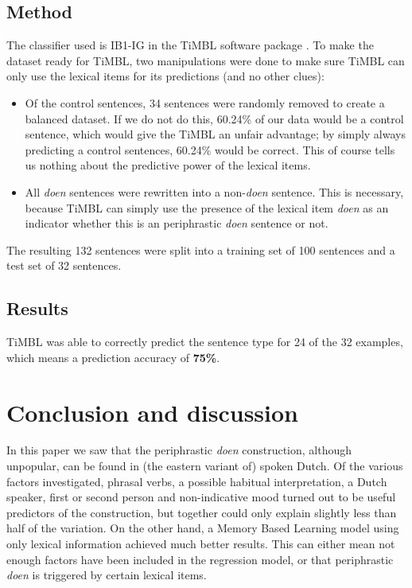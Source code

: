 \documentclass[12pt]{article}
\begin{document}
\subsection{Method}

The classifier used is IB1-IG in the TiMBL software package \citep{d10}. To make the dataset ready for TiMBL, two manipulations were done to make sure TiMBL can only use the lexical items for its predictions (and no other clues):

\begin{itemize}

\item Of the control sentences, 34 sentences were randomly removed to create a balanced dataset. If we do not do this, 60.24\% of our data would be a control sentence, which would give the TiMBL an unfair advantage; by simply always predicting a control sentences, 60.24\% would be correct. This of course tells us nothing about the predictive power of the lexical items.
\item All \emph{doen} sentences were rewritten into a non-\emph{doen} sentence. This is necessary, because TiMBL can simply use the presence of the lexical item \emph{doen} as an indicator whether this is an periphrastic \emph{doen} sentence or not.

\end{itemize}

The resulting 132 sentences were split into a training set of 100 sentences and a test set of 32 sentences.

\subsection{Results}

TiMBL was able to correctly predict the sentence type for 24 of the 32 examples, which means a prediction accuracy of \textbf{75\%}.






\section{Conclusion and discussion} \label{conc}
In this paper we saw that the periphrastic \emph{doen} construction, although unpopular, can be found in (the eastern variant of) spoken Dutch. Of the various factors investigated, phrasal verbs, a possible habitual interpretation, a Dutch speaker, first or second person and non-indicative mood turned out to be useful predictors of the construction, but together could only explain slightly less than half of the variation. On the other hand, a Memory Based Learning model using only lexical information achieved much better results. This can either mean not enough factors have been included in the regression model, or that periphrastic \emph{doen} is triggered by certain lexical items.
\end{document}

